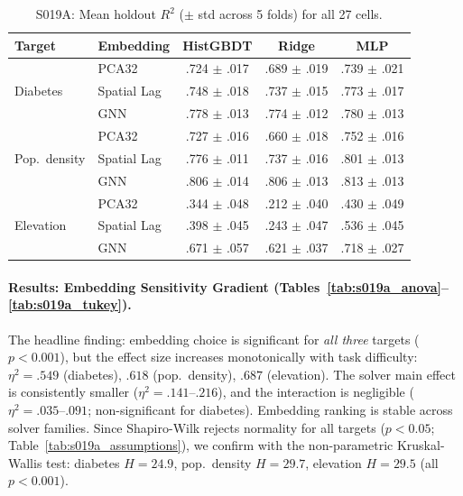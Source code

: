 \documentclass{article}
\begin{document}
\begin{table}[htbp]
\centering
\small
\caption{S019A: Mean holdout $R^2$ ($\pm$ std across 5 folds) for all 27 cells.}
\label{tab:s019a_r2}
\begin{tabular}{ll|ccc}
\toprule
\textbf{Target} & \textbf{Embedding} & \textbf{HistGBDT} & \textbf{Ridge} & \textbf{MLP} \\
\midrule
\multirow{3}{*}{Diabetes}
& PCA32       & .724 $\pm$ .017 & .689 $\pm$ .019 & .739 $\pm$ .021 \\
& Spatial Lag & .748 $\pm$ .018 & .737 $\pm$ .015 & .773 $\pm$ .017 \\
& GNN         & .778 $\pm$ .013 & .774 $\pm$ .012 & .780 $\pm$ .013 \\
\midrule
\multirow{3}{*}{Pop.\ density}
& PCA32       & .727 $\pm$ .016 & .660 $\pm$ .018 & .752 $\pm$ .016 \\
& Spatial Lag & .776 $\pm$ .011 & .737 $\pm$ .016 & .801 $\pm$ .013 \\
& GNN         & .806 $\pm$ .014 & .806 $\pm$ .013 & .813 $\pm$ .013 \\
\midrule
\multirow{3}{*}{Elevation}
& PCA32       & .344 $\pm$ .048 & .212 $\pm$ .040 & .430 $\pm$ .049 \\
& Spatial Lag & .398 $\pm$ .045 & .243 $\pm$ .047 & .536 $\pm$ .045 \\
& GNN         & .671 $\pm$ .057 & .621 $\pm$ .037 & .718 $\pm$ .027 \\
\bottomrule
\end{tabular}
\end{table}

\paragraph{Results: Embedding Sensitivity Gradient (Tables~\ref{tab:s019a_anova}--\ref{tab:s019a_tukey}).}
The headline finding: embedding choice is significant for \emph{all three} targets ($p < 0.001$), but the effect size increases monotonically with task difficulty: $\eta^2 = .549$ (diabetes), $.618$ (pop.\ density), $.687$ (elevation). The solver main effect is consistently smaller ($\eta^2 = .141$--$.216$), and the interaction is negligible ($\eta^2 = .035$--$.091$; non-significant for diabetes). Embedding ranking is stable across solver families. Since Shapiro-Wilk rejects normality for all targets ($p < 0.05$; Table~\ref{tab:s019a_assumptions}), we confirm with the non-parametric Kruskal-Wallis test: diabetes $H = 24.9$, pop.\ density $H = 29.7$, elevation $H = 29.5$ (all $p < 0.001$).
\end{document}
